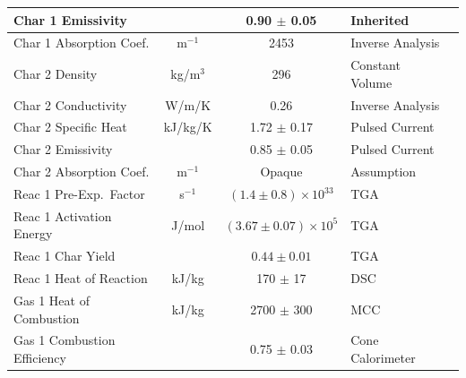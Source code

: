 \begin{table}[h!]
\begin{center}
\begin{tabular}{|l|c|c|l|l|}
Char 1 Emissivity           &               & 0.90 $\pm$ 0.05                   & Inherited                 &  \cite{Stoliarov:CF2010}                  \\ \hline
Char 1 Absorption Coef.     & m$^{-1}$      & 2453                              & Inverse Analysis          &  \cite{Stoliarov:CF2010}                  \\ \hline
Char 2 Density              & kg/m$^3$      & 296                               & Constant Volume           &  \cite{Stoliarov:CF2010}                  \\ \hline
Char 2 Conductivity         & W/m/K         & 0.26                              & Inverse Analysis          &  \cite{Stoliarov:CF2010}                  \\ \hline
Char 2 Specific Heat        & kJ/kg/K       & 1.72 $\pm$ 0.17                   & Pulsed Current            &  \cite{Stoliarov:CF2010,Matsumoto:1996}   \\ \hline
Char 2 Emissivity           &               & 0.85 $\pm$ 0.05                   & Pulsed Current            &  \cite{Stoliarov:CF2010,Matsumoto:1996}   \\ \hline
Char 2 Absorption Coef.     & m$^{-1}$      & Opaque                            & Assumption                &  \cite{Stoliarov:CF2010}                  \\ \hline
Reac 1 Pre-Exp.~Factor      & s$^{-1}$      & $(1.4 \pm 0.8) \times 10^{33}$    & TGA                       &  \cite{Stoliarov:CF2010}                  \\ \hline
Reac 1 Activation Energy    & J/mol       & $(3.67 \pm 0.07) \times 10^{5}$   & TGA                       &  \cite{Stoliarov:CF2010}                  \\ \hline
Reac 1 Char Yield           &               & $0.44 \pm 0.01$                   & TGA                       &  \cite{Stoliarov:CF2010}                  \\ \hline
Reac 1 Heat of Reaction     & kJ/kg         & 170 $\pm$ 17                      & DSC                       &  \cite{Stoliarov:PDS2008}                 \\ \hline
Gas 1 Heat of Combustion    & kJ/kg         & 2700 $\pm$ 300                    & MCC                       &  \cite{Stoliarov:CF2010}                  \\ \hline
Gas 1 Combustion Efficiency &               & 0.75 $\pm$ 0.03                   & Cone Calorimeter          &  \cite{Stoliarov:CF2010}                  \\ \hline

\end{tabular}
\end{center}
\end{table}
